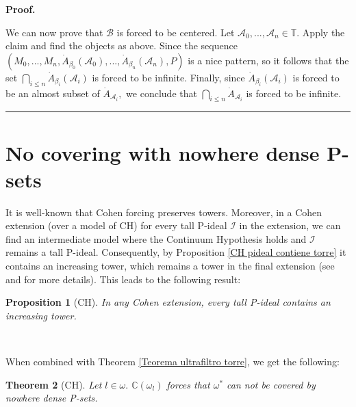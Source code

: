 \documentclass{article}%
\newtheorem{theorem}{Theorem}
\newtheorem{proposition}[theorem]{Proposition}
\newenvironment{proof}[1][Proof]{\noindent\textbf{#1.} }{\ \rule{0.5em}{0.5em}}
\begin{document}
\begin{proof}
\qquad\qquad\qquad

We can now prove that $\mathcal{B}$ is forced to be centered. Let
$\mathcal{A}_{0},...,\mathcal{A}_{n}\in\mathbb{T}.$ Apply the claim and find
the objects as above. Since the sequence\newline$(M_{0},...,M_{n},\dot
{A}_{\beta_{0}}(\mathcal{A}_{0}),...,\dot{A}_{\beta_{n}}(\mathcal{A}_{n}),P)$
is a nice pattern, so it follows that the set $\bigcap\limits_{i\leq n}\dot
{A}_{\beta_{i}}(\mathcal{A}_{i})$ is forced to be infinite. Finally, since
$\dot{A}_{\beta_{i}}(\mathcal{A}_{i})$ is forced to be an almost subset of
$\dot{A}_{\mathcal{A}_{i}},$ we conclude that $\bigcap\limits_{i\leq n}\dot
{A}_{\mathcal{A}_{i}}$ is forced to be infinite.
\end{proof}

\section{No covering with nowhere dense P-sets \label{Seccion Covering}}

It is well-known that Cohen forcing preserves towers. Moreover, in a Cohen
extension (over a model of \textsf{CH}) for every tall \textsf{P}-ideal
$\mathcal{I}$ in the extension, we can find an intermediate model where the
Continuum Hypothesis holds and $\mathcal{I}$ remains a tall \textsf{P}-ideal.
Consequently, by Proposition \ref{CH pideal contiene torre} it contains an
increasing tower, which remains a tower in the final extension (see
\cite{PFiltersCohenRandomLaver} and \cite{SetTheoryinTopology} for more
details). This leads to the following result:

\begin{proposition}
[\textsf{CH}]In any Cohen extension, every tall \textsf{P}-ideal contains an
increasing tower. \label{P ideales modelo de Cohen}
\end{proposition}

\qquad\ \qquad\ \ \ \ \ \ 

When combined with Theorem \ref{Teorema ultrafiltro torre}, we get the following:

\begin{theorem}
[\textsf{CH}]Let $l\in\omega.$ $\mathbb{C}\left(  \omega_{l}\right)  $ forces
that $\omega^{\ast}$ can not be covered by nowhere dense \textsf{P}-sets.
\label{Teorema para Cohen}
\end{theorem}

\qquad\qquad\qquad\qquad\ \ \ 
\end{document}
